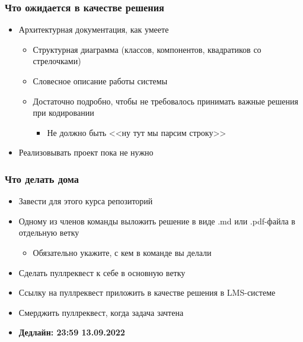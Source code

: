 \documentclass{../mcsslides}
\begin{document}
    \begin{frame}
        \frametitle{Что ожидается в качестве решения}
        \begin{itemize}
            \item Архитектурная документация, как умеете
            \begin{itemize}
                \item Структурная диаграмма (классов, компонентов, квадратиков со стрелочками)
                \item Словесное описание работы системы
                \item Достаточно подробно, чтобы не требовалось принимать важные решения при кодировании
                \begin{itemize}
                    \item Не должно быть <<ну тут мы парсим строку>>
                \end{itemize}
            \end{itemize}
            \item Реализовывать проект пока не нужно
        \end{itemize}
    \end{frame}

    \begin{frame}
        \frametitle{Что делать дома}
        \begin{itemize}
            \item Завести для этого курса репозиторий
            \item Одному из членов команды выложить решение в виде .md или .pdf-файла в отдельную ветку
            \begin{itemize}
                \item Обязательно укажите, с кем в команде вы делали
            \end{itemize}
            \item Сделать пуллреквест к себе в основную ветку
            \item Ссылку на пуллреквест приложить в качестве решения в LMS-системе
            \item Смерджить пуллреквест, когда задача зачтена
            \item \textbf{Дедлайн: 23:59 13.09.2022}
        \end{itemize}
    \end{frame}
\end{document}
